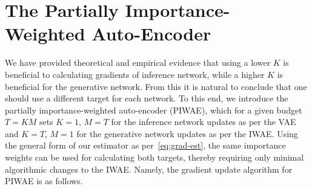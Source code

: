 
\section{The Partially Importance-Weighted Auto-Encoder}
\label{sec:piwae}

We have provided theoretical and empirical evidence that using a
lower $K$ is beneficial to calculating gradients of inference network,  while a higher $K$
is beneficial for the generative network.  From this it is natural to conclude
that one should use a different target for each network.  To this end, we introduce
the partially importance-weighted auto-encoder (\gls{PIWAE}), which for a given budget $T=KM$
sets $K=1$, $M=T$ for the inference network updates as per the \gls{VAE} and 
$K=T$, $M=1$ for the generative network updates as per the \gls{IWAE}.  Using
the general form of our estimator as per~\eqref{eq:grad-est}, the same importance
weights can be used for calculating both targets, thereby requiring only minimal
algorithmic changes to the \gls{IWAE}.  Namely, the gradient update algorithm for
\gls{PIWAE} is as follows.


